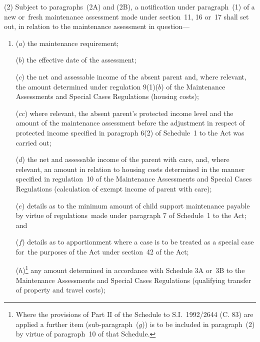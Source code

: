 \documentclass[a4paper,12pt]{article}
\begin{document}
(2) 
Subject to 
  paragraphs~(2A) and (2B),  %
a notification under paragraph~(1)  %
of a new or~fresh maintenance assessment made under section~11, 16 or~17  %
shall set out, in relation to the maintenance assessment in question—
\begin{enumerate}\item[]
($a$) the maintenance requirement;

($b$) the effective date of the assessment;


($c$) the net and assessable income of the absent parent and, where relevant, the amount determined under regulation 9(1)($b$) of the Maintenance Assessments and Special Cases Regulations (housing costs);

($cc$) where relevant, the absent parent’s protected income level and the amount of the maintenance assessment before the adjustment in respect of protected income specified in paragraph 6(2) of Schedule~1 to the Act was carried out;


($d$) the net and assessable income of the parent with care, and, where relevant, an amount in relation to housing costs determined in the manner specified in regulation~10 of the Maintenance Assessments and Special Cases Regulations (calculation of exempt income of parent with care);

($e$) details as to the minimum amount of child support maintenance payable by virtue of regulations~made under paragraph 7 of Schedule~1 to the Act; and

($f$) details as to apportionment where a case is to be treated as a special case for~the purposes of the Act under section~42 of the Act;

($h$)\footnote{\frenchspacing Where the provisions of Part II of the Schedule to S.I.~1992/2644 (C. 83) are applied a further item (sub-paragraph~($g$)) is to be included in paragraph~(2) by virtue of paragraph~10 of that Schedule.} any amount determined in accordance with Schedule 3A or~3B to the Maintenance Assessments and Special Cases Regulations (qualifying transfer of property and travel costs);


\end{enumerate}
\end{document}
